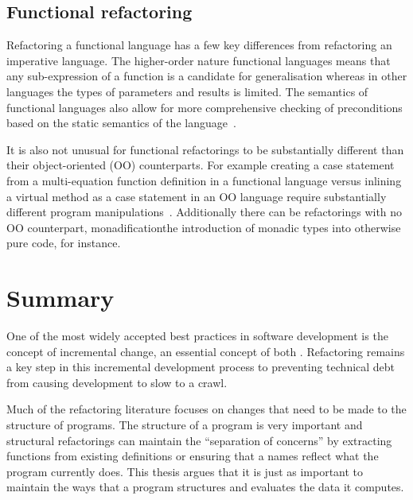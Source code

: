 \subsection{Functional refactoring}

Refactoring a functional language has a few key differences from refactoring an imperative language. The higher-order nature \DIFaddbegin {}\DIFaddend functional languages means that any sub-expression of a function is a candidate for generalisation whereas in other languages the types of parameters and results is limited. \DIFaddbegin {}\DIFaddend The semantics of functional languages also allow for more comprehensive checking of preconditions based on the static semantics of the language~\citep{refacTools}.

It is also not unusual for functional refactorings to be substantially different than their object-oriented (OO) counterparts. For example creating a case statement from a multi-equation function definition in a functional language versus inlining a virtual method as a case statement in an OO language require substantially different program manipulations~\citep{huiqingThesis}. Additionally there can be refactorings with no OO counterpart, monadification\DIFaddbegin \DIFadd{, }\DIFaddend the introduction of monadic types into otherwise pure code, for instance.

\section{Summary}

One of the most widely accepted best practices in software development is the concept of incremental change, an essential concept of both \DIFdelbegin {}\DIFdelend \DIFaddbegin {}\DIFaddend . Refactoring remains a key step in this incremental development process to preventing technical debt from causing development to slow to a crawl.

Much of the refactoring literature focuses on changes that need to be made to the structure of programs. The structure of a program is very important and structural refactorings can maintain the ``separation of concerns'' by extracting functions from existing definitions or ensuring that a \DIFdelbegin {}\DIFdelend \DIFaddbegin {}\DIFaddend names reflect what the program currently does. This thesis argues that it is just as important to maintain the ways that a program structures and evaluates the data it computes.


